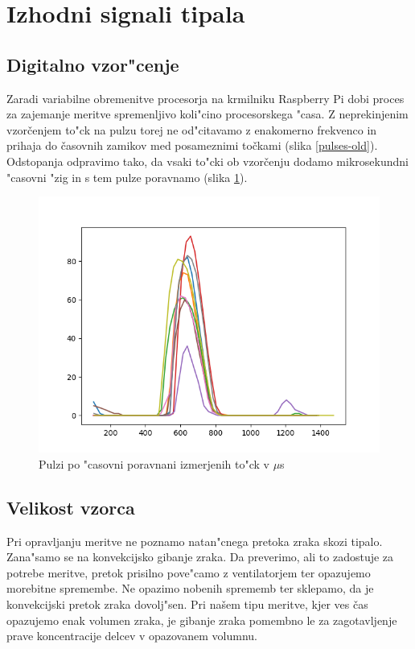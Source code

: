\documentclass[11pt,a4paper]{article}
\begin{document}
\clearpage

\section{Izhodni signali tipala}

\subsection{Digitalno vzor"cenje}
Zaradi variabilne obremenitve procesorja na krmilniku Raspberry Pi dobi proces za zajemanje meritve spremenljivo koli"cino procesorskega "casa. Z neprekinjenim vzorčenjem to"ck na pulzu torej ne od"citavamo z enakomerno frekvenco in prihaja do časovnih zamikov med posameznimi točkami (slika \ref{pulses-old}). Odstopanja odpravimo tako, da vsaki to"cki ob vzorčenju dodamo mikrosekundni "casovni "zig in s tem pulze poravnamo (slika \ref{aligned}).

\begin{figure}[H]
	\begin{center}
		\includegraphics[width=12cm]{aligned.png}
		\caption{Pulzi po "casovni poravnani izmerjenih to"ck v $\mu$s}
		\label{aligned}
	\end{center}
\end{figure}

\subsection{Velikost vzorca}
Pri opravljanju meritve ne poznamo natan"cnega pretoka zraka skozi tipalo. Zana"samo se na konvekcijsko gibanje zraka. Da preverimo, ali to zadostuje za potrebe meritve, pretok prisilno pove"camo z ventilatorjem ter opazujemo morebitne spremembe. Ne opazimo nobenih sprememb ter sklepamo, da je konvekcijski pretok zraka dovolj"sen. Pri našem tipu meritve, kjer ves čas opazujemo enak volumen zraka, je gibanje zraka pomembno le za zagotavljenje prave koncentracije delcev v opazovanem volumnu. 
\end{document}
